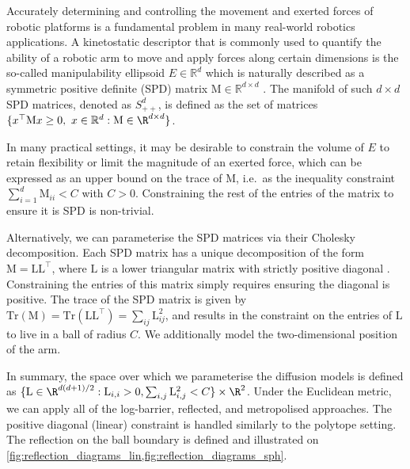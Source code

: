 Accurately determining and controlling the movement and exerted forces of robotic platforms is a fundamental problem in many real-world robotics applications.
A kinetostatic descriptor that is commonly used to quantify the ability of a robotic arm to move and apply forces along certain dimensions is the so-called manipulability ellipsoid \(E\in\mathbb{R}^d\) \parencite{yoshikawa1985manipulability} which is naturally described as a symmetric positive definite (SPD) matrix \(\mathrm{M} \in\mathbb{R}^{d\times d}\) \parencite{jaquier2021geometry}.
The manifold of such \(d\times d\) SPD matrices, denoted as \(S_{++}^d\), is defined as the set of matrices \( \{ x^\top \mathrm{M} x \geq 0 , \ x\in \mathbb{R}^d : \mathrm{M} \in \R^{d \times d} \} \).

In many practical settings, it may be desirable to constrain the volume of \(E\) to retain flexibility or limit the magnitude of an exerted force, which can be expressed as an upper bound on the trace of \(\mathrm{M}\), i.e.\ as the inequality constraint \(\sum_{i=1}^d \mathrm{M}_{ii} < C\) with \(C >0\).
Constraining the rest of the entries of the matrix to ensure it is SPD is non-trivial.

Alternatively, we can parameterise the SPD matrices via their Cholesky decomposition.
Each SPD matrix has a unique decomposition of the form \(\mathrm{M} = \mathrm{L} \mathrm{L}^\top\), where \( \mathrm{L}\) is a lower triangular matrix with strictly positive diagonal \parencite[p.143]{golub2013matrix}.
Constraining the entries of this matrix simply requires ensuring the diagonal is positive.
The trace of the SPD matrix is given by \(\mathrm{Tr}(\mathrm{M}) = \mathrm{Tr}(\mathrm{L} \mathrm{L}^\top) = \sum_{ij}\mathrm{L}_{ij}^2\), and results in the constraint on the entries of \(\mathrm{L}\) to live in a ball of radius \(C\).
We additionally model the two-dimensional position of the arm.

In summary, the space over which we parameterise the diffusion models is defined as \(\{ \mathrm{L} \in \R^{d(d+1)/2} : \mathrm{L}_{i,i} > 0, \sum_{i,j} \mathrm{L}_{i,j}^2 < C \} \times \R^2\).
Under the Euclidean metric, we can apply all of the log-barrier, reflected, and metropolised approaches.
The positive diagonal (linear) constraint is handled similarly to the polytope setting.
The reflection on the ball boundary is defined and illustrated on \cref{fig:reflection_diagrams_lin,fig:reflection_diagrams_sph}.

